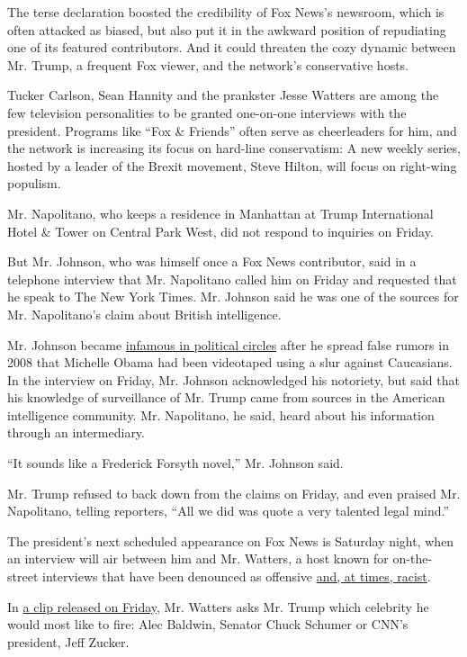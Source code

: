 The terse declaration boosted the credibility of Fox News's newsroom,
which is often attacked as biased, but also put it in the awkward
position of repudiating one of its featured contributors. And it could
threaten the cozy dynamic between Mr. Trump, a frequent Fox viewer, and
the network's conservative hosts.

Tucker Carlson, Sean Hannity and the prankster Jesse Watters are among
the few television personalities to be granted one-on-one interviews
with the president. Programs like ``Fox \& Friends'' often serve as
cheerleaders for him, and the network is increasing its focus on
hard-line conservatism: A new weekly series, hosted by a leader of the
Brexit movement, Steve Hilton, will focus on right-wing populism.

Mr. Napolitano, who keeps a residence in Manhattan at Trump
International Hotel \& Tower on Central Park West, did not respond to
inquiries on Friday.

But Mr. Johnson, who was himself once a Fox News contributor, said in a
telephone interview that Mr. Napolitano called him on Friday and
requested that he speak to The New York Times. Mr. Johnson said he was
one of the sources for Mr. Napolitano's claim about British
intelligence.

Mr. Johnson became
\href{http://prospect.org/article/larry-johnsons-strange-trip}{infamous
in political circles} after he spread false rumors in 2008 that Michelle
Obama had been videotaped using a slur against Caucasians. In the
interview on Friday, Mr. Johnson acknowledged his notoriety, but said
that his knowledge of surveillance of Mr. Trump came from sources in the
American intelligence community. Mr. Napolitano, he said, heard about
his information through an intermediary.

``It sounds like a Frederick Forsyth novel,'' Mr. Johnson said.

Mr. Trump refused to back down from the claims on Friday, and even
praised Mr. Napolitano, telling reporters, ``All we did was quote a very
talented legal mind.''

The president's next scheduled appearance on Fox News is Saturday night,
when an interview will air between him and Mr. Watters, a host known for
on-the-street interviews that have been denounced as offensive
\href{https://www.nytimes3xbfgragh.onion/2016/10/07/business/media/fox-reporter-accused-of-racism-for-chinatown-interviews-on-trump-clinton-and-china.html}{and,
at times, racist}.

In
\href{http://deadline.com/2017/03/jesse-watters-donald-trump-alec-baldwin-jeff-zucker-fire-fox-news-video-1202045640/}{a
clip released on Friday}, Mr. Watters asks Mr. Trump which celebrity he
would most like to fire: Alec Baldwin, Senator Chuck Schumer or CNN's
president, Jeff Zucker.

